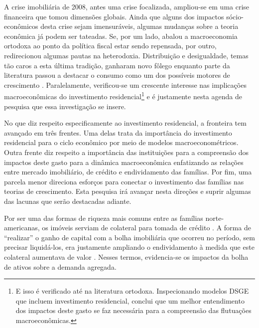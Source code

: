 A crise imobiliária de 2008, antes uma crise focalizada, ampliou-se em uma crise financeira que tomou dimensões globais. Ainda que alguns dos impactos sócio-econômicos desta crise sejam imensuráveis, algumas mudanças sobre a teoria econômica já podem ser tateadas. Se, por um lado, abalou a macroeconomia ortodoxa ao ponto da política fiscal estar sendo repensada, por outro, redirecionou algumas pautas na heterodoxia. Distribuição e desigualdade, temas tão caros a esta última tradição, ganharam novo fôlego \cites{carvalho_personal_2016}{ederer_will_2019} enquanto parte da literatura passou a destacar o consumo como um dos possíveis motores de crescimento \cite{brochier_macroeconomics_2017}. Paralelamente, verificou-se um crescente interesse nas implicações macroeconômicas do investimento residencial\footnote{E isso é verificado até na literatura ortodoxa. Inspecionando modelos DSGE que incluem investimento residencial, \textcite{iacoviello_housing_2010} conclui que um melhor entendimento dos impactos deste gasto se faz necessária para a compreensão das flutuações macroeconômicas.} \cite{fiebiger_semi-autonomous_2018} e é justamente nesta agenda de pesquisa que essa investigação se insere. 


No que diz respeito especificamente ao investimento residencial, a fronteira tem avançado em três frentes. Uma delas trata da importância do investimento residencial para o ciclo econômico por meio de modelos macroeconométricos.
Outra frente  diz respeito a importância das instituições para a compreensão dos impactos deste gasto para a dinâmica macroeconômica enfatizando as relações entre mercado imobiliário, de crédito e endividamento das famílias. 
Por fim, uma parcela menor direciona esforços para conectar o investimento das famílias nas teorias de crescimento. Esta pesquisa irá avançar nesta direções e suprir algumas das lacunas que serão destacadas adiante.

 
Por ser  uma das formas de riqueza mais comuns entre as famílias norte-americanas, os imóveis serviam de colateral para tomada de crédito \cite{teixeira_uma_2011}. A forma de ``realizar'' o ganho de capital com a bolha imobiliária que ocorreu no período, sem precisar liquidá-los, era justamente ampliando o endividamento à medida que este colateral aumentava de valor \cite{teixeira_crescimento_2015}. Nesses termos, evidencia-se os impactos da bolha de ativos sobre a demanda agregada. 


